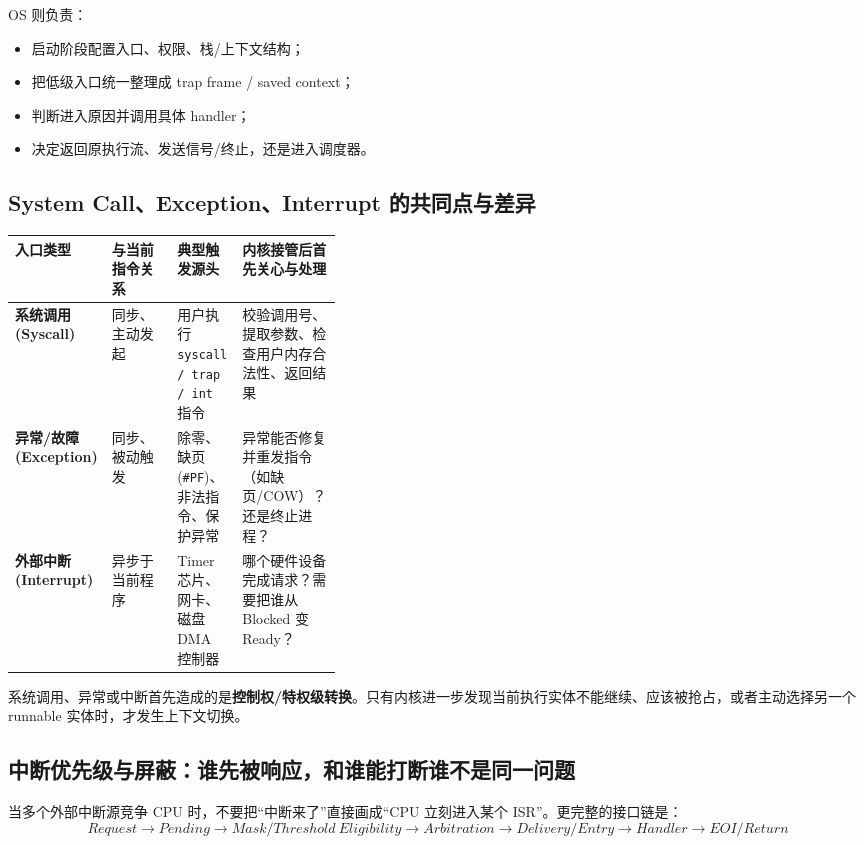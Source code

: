 \documentclass[11pt,a4paper]{ctexart}
\newcommand{\kw}[1]{\textbf{#1}}
\newcommand{\code}[1]{\texttt{#1}}
\begin{document}
OS 则负责：
\begin{itemize}
  \item 启动阶段配置入口、权限、栈/上下文结构；
  \item 把低级入口统一整理成 trap frame / saved context；
  \item 判断进入原因并调用具体 handler；
  \item 决定返回原执行流、发送信号/终止，还是进入调度器。
\end{itemize}

\subsection{System Call、Exception、Interrupt 的共同点与差异}

\begingroup
\small
\renewcommand{\arraystretch}{1.25}
\setlength{\tabcolsep}{6pt}
\begin{tabularx}{\linewidth}{>{\bfseries}p{0.18\linewidth} p{0.2\linewidth} X X}
\toprule
入口类型 & 与当前指令关系 & 典型触发源头 & 内核接管后首先关心与处理\\
\midrule
系统调用 (Syscall) & 同步、主动发起 & 用户执行 \code{syscall / trap / int} 指令 & 校验调用号、提取参数、检查用户内存合法性、返回结果\\
异常/故障 (Exception) & 同步、被动触发 & 除零、缺页 (\code{\#PF})、非法指令、保护异常 & 异常能否修复并重发指令（如缺页/COW）？还是终止进程？\\
外部中断 (Interrupt) & 异步于当前程序 & Timer 芯片、网卡、磁盘 DMA 控制器 & 哪个硬件设备完成请求？需要把谁从 Blocked 变 Ready？\\
\bottomrule
\end{tabularx}
\endgroup

\begin{exam}[408 核心：进入内核态不等于上下文切换]
系统调用、异常或中断首先造成的是\kw{控制权/特权级转换}。只有内核进一步发现当前执行实体不能继续、应该被抢占，或者主动选择另一个 runnable 实体时，才发生上下文切换。
\end{exam}

\subsection{中断优先级与屏蔽：谁先被响应，和谁能打断谁不是同一问题}

当多个外部中断源竞争 CPU 时，不要把“中断来了”直接画成“CPU 立刻进入某个 ISR”。更完整的接口链是：
\[
\boxed{
Request
\rightarrow
Pending
\rightarrow
Mask/Threshold\ Eligibility
\rightarrow
Arbitration
\rightarrow
Delivery/Entry
\rightarrow
Handler
\rightarrow
EOI/Return
}
\]
\end{document}
